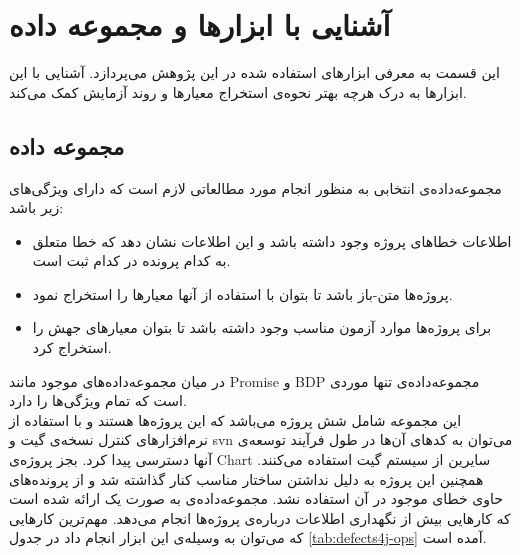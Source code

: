 \section{ آشنایی با ابزارها و مجموعه داده}
این قسمت به معرفی ابزارهای استفاده شده در این پژوهش می‌پردازد. آشنایی با این ابزارها به درک هرچه بهتر  نحوه‌ی استخراج معیارها  و روند آزمایش کمک می‌کند.

\subsection{مجموعه داده }
 مجموعه‌‌داده‌ی انتخابی به منظور انجام مورد مطالعاتی لازم است که دارای ویژگی‌های زیر باشد:
 \begin{itemize}
 	\item
 	اطلاعات خطاهای پروژه وجود داشته باشد و این اطلاعات نشان دهد که خطا متعلق به کدام پرونده در کدام ثبت است. 
 	\item
 	پروژه‌ها متن-باز باشد تا بتوان با استفاده از  آنها معیارها را استخراج نمود.
 	\item
 	برای پروژه‌ها موارد آزمون مناسب وجود داشته باشد تا بتوان معیارهای جهش را استخراج کرد.
 \end{itemize}
 در میان مجموعه‌داده‌های موجود  مانند 
 Promise \cite{boetticher2007promise} و BDP
 \cite{d2012evaluating}
  مجموعه‌داده‌ی  تنها موردی است که تمام ویژگی‌ها را دارد.\\
 
این مجموعه شامل  شش پروژه می‌باشد که این پروژه‌ها   هستند و با استفاده از نرم‌افزارهای کنترل نسخه‌ی گیت و svn می‌توان به کدهای آن‌ها در طول فرآیند توسعه‌ی آنها دسترسی پیدا کرد. بجز پروژه‌ی Chart سایرین از سیستم گیت استفاده می‌کنند. همچنین این پروژه به دلیل نداشتن ساختار مناسب کنار گذاشته شد و از پرونده‌های حاوی خطای  موجود در آن استفاده نشد. 
مجموعه‌داده‌ی  به صورت یک  ارائه شده است که کارهایی بیش از نگهداری اطلاعات درباره‌ی پروژه‌ها انجام می‌دهد. مهم‌ترین  کارهایی که می‌توان به وسیله‌ی این ابزار انجام داد در جدول \ref{tab:defects4j-ops} آمده است. 



